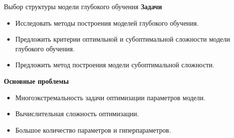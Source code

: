 \documentclass[usenames,dvipsnames,11pt,pdf,utf8,russian,aspectratio=169]{beamer}
\begin{document}
\begin{frame}{Выбор  структуры модели глубокого обучения}
\textbf{Задачи}
\begin{itemize}
\item Исследовать методы построения моделей глубокого обучения.
\item Предложить критерии оптимльной и субоптимальной сложности модели глубокого обучения.
\item Предложить метод построения модели субоптимальной сложности.
\end{itemize}
\textbf{Основные проблемы}
\begin{itemize}
\item Многоэкстремальность задачи оптимизации параметров модели.
\item Вычислительная сложность оптимизации.
\item Большое количество параметров и гиперпараметров.
\end{itemize}

\end{frame}
\end{document}
